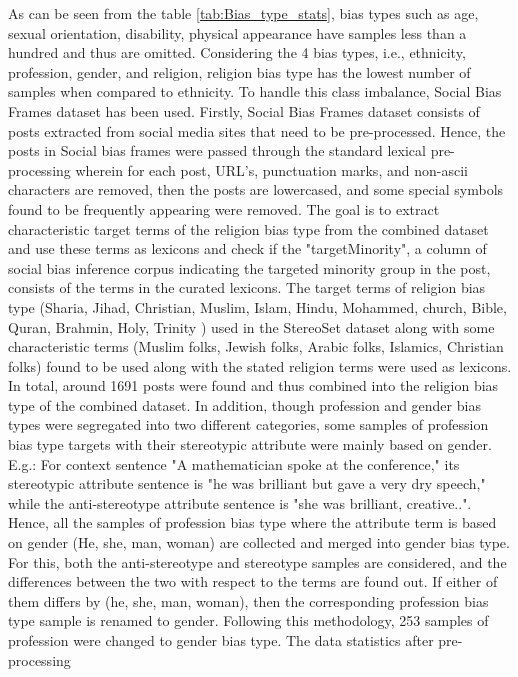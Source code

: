 As can be seen from the table \ref{tab:Bias_type_stats}, bias types such as age, sexual orientation, disability, physical appearance have samples less than a hundred and thus are omitted. Considering the 4 bias types, i.e., ethnicity, profession, gender, and religion, religion bias type has the lowest number of samples when compared to ethnicity. To handle this class imbalance, Social Bias Frames dataset has been used. Firstly, Social Bias Frames dataset consists of posts extracted from social media sites that need to be pre-processed. Hence, the posts in Social bias frames were passed through the standard lexical pre-processing wherein for each post, URL's, punctuation marks, and non-ascii characters are removed, then the posts are lowercased, and some special symbols found to be frequently appearing were removed. The goal is to extract characteristic target terms of the religion bias type from the combined dataset and use these terms as lexicons and check if the "targetMinority", a column of social bias inference corpus indicating the targeted minority group in the post, consists of the terms in the curated lexicons. The target terms of religion bias type (Sharia, Jihad, Christian, Muslim, Islam, Hindu, Mohammed, church, Bible, Quran, Brahmin, Holy, Trinity \cite{nadeem2020stereoset}) used in the StereoSet dataset along with some characteristic terms (Muslim folks, Jewish folks, Arabic folks, Islamics, Christian folks) found to be used along with the stated religion terms were used as lexicons. In total, around 1691 posts were found and thus combined into the religion bias type of the combined dataset. In addition, though profession and gender bias types were segregated into two different categories, some samples of profession bias type targets with their stereotypic attribute were mainly based on gender. E.g.: For context sentence "A mathematician spoke at the conference," its stereotypic attribute sentence is "he was brilliant but gave a very dry speech," while the anti-stereotype attribute sentence is "she was brilliant, creative..". Hence, all the samples of profession bias type where the attribute term is based on gender (He, she, man, woman) are collected and merged into gender bias type. For this, both the anti-stereotype and stereotype samples are considered, and the differences between the two with respect to the terms are found out. If either of them differs by (he, she, man, woman), then the corresponding profession bias type sample is renamed to gender. Following this methodology, 253 samples of profession were changed to gender bias type.  The data statistics after pre-processing    

